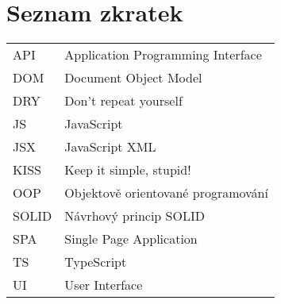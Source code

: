 \section*{Seznam zkratek}
\vspace{2em}

\noindent
\begin{tabular}{@{}ll@{}}
API	  &	Application Programming Interface\\
DOM	  &	Document Object Model\\
DRY	  &	Don't repeat yourself\\
JS    & JavaScript\\
JSX   & JavaScript XML\\
KISS	&	Keep it simple, stupid!\\
OOP	  &	Objektově orientované programování\\
SOLID	&	Návrhový princip SOLID\\
SPA   & Single Page Application\\
TS    & TypeScript\\
UI    & User Interface
\end{tabular}

